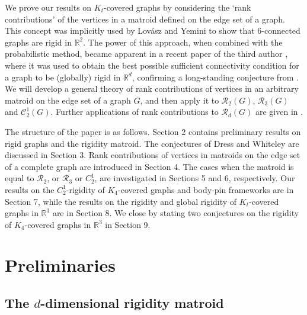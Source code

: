 \documentclass[11pt,a4paper]{article}
\theoremstyle{definition}
\newcommand{\cR}{\mathcal{R}}
\newcommand{\R}{\mathbb{R}}
\newcommand{\cC}{\mathcal{C}}
\begin{document}
We prove our results on
$K_t$-covered graphs by considering the `rank contributions' of the vertices in a matroid defined on the edge set of a graph. This concept was implicitly
used by Lov\'asz and Yemini \cite{LY}
to show that 6-connected graphs are rigid in $\R^2$. The power of this approach, when combined with the probabilistic method, became apparent in  a recent paper of the third author \cite{vill}, where it was used to obtain the best possible sufficient connectivity condition for a graph to be (globally) rigid in $\R^d$, confirming
a long-standing conjecture from \cite{LY}. We will develop a general 
theory of 
rank contributions of vertices in an arbitrary matroid on the edge set of a graph $G$, and then apply it to $\cR_2(G)$, $\cR_3(G)$ and $\cC^1_2(G)$. Further applications of rank contributions to $\cR_d(G)$ are given in \cite{JLV}.

The structure of the paper is as follows. 
Section 2 contains preliminary results on rigid graphs and the rigidity matroid.
The conjectures of Dress and Whiteley are discussed in Section 3. 
Rank contributions of vertices in matroids on the edge set of a complete graph
are introduced in Section 4. The cases when the matroid is equal to 
$\cR_2$, or  $\cR_3$ or $C_2^1$, are investigated in Sections 5 and 6, respectively.
Our results on the
$C^1_2$-rigidity of $K_4$-covered graphs and body-pin frameworks are in Section 7,
while the results on
the rigidity and global rigidity of 
$K_t$-covered graphs in $\R^3$
are in Section 8. We close by stating two conjectures on the rigidity of $K_4$-covered graphs in $\R^3$ in Section 9.




\section{Preliminaries}

\subsection{The $d$-dimensional rigidity matroid}
\end{document}
